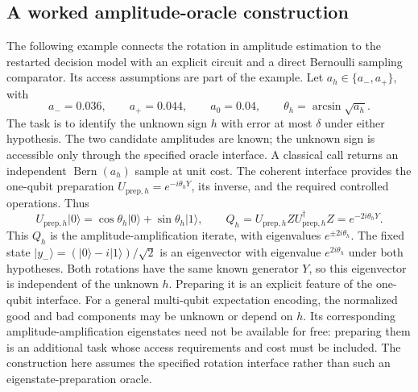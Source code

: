 \documentclass[11pt,a4paper]{article}
\newcommand{\ket}[1]{\lvert #1\rangle}
\theoremstyle{definition}
\theoremstyle{remark}
\numberwithin{equation}{section}
\begin{document}
\subsection{A worked amplitude-oracle construction}
The following example connects the rotation in amplitude estimation to
the restarted decision model with an explicit circuit and a direct
Bernoulli sampling comparator. Its access assumptions are part of the
example. Let $a_h\in\{a_-,a_+\}$, with
\[
 a_-=0.036,\qquad a_+=0.044,\qquad a_0=0.04,
 \qquad \theta_h=\arcsin\sqrt{a_h}.
\]
The task is to identify the unknown sign $h$ with error at most $\delta$
under either hypothesis. The two candidate amplitudes are known; the
unknown sign is accessible only through the specified oracle interface.
A classical call returns an independent $\operatorname{Bern}(a_h)$ sample
at unit cost. The coherent interface provides the one-qubit preparation
$U_{\mathrm{prep},h}=e^{-i\theta_hY}$, its inverse, and the required
controlled operations. Thus
\[
 U_{\mathrm{prep},h}\ket{0}
 =\cos\theta_h\ket{0}+\sin\theta_h\ket{1},
 \qquad
 Q_h=U_{\mathrm{prep},h}ZU_{\mathrm{prep},h}^{\dagger}Z
 =e^{-2i\theta_hY}.
\]
This $Q_h$ is the amplitude-amplification iterate, with eigenvalues
$e^{\pm2i\theta_h}$. The fixed state
$\ket{y_-}=(\ket{0}-i\ket{1})/\sqrt2$ is an eigenvector with eigenvalue
$e^{2i\theta_h}$ under both hypotheses. Both rotations have the same
known generator $Y$, so this eigenvector is independent of the unknown
$h$. Preparing it is an explicit feature of the one-qubit interface.
For a general multi-qubit expectation encoding, the normalized good and
bad components may be unknown or depend on $h$. Its corresponding
amplitude-amplification eigenstates need not be available for free:
preparing them is an additional task whose access requirements and cost
must be included. The construction here assumes the specified rotation
interface rather than such an eigenstate-preparation oracle.
\end{document}
